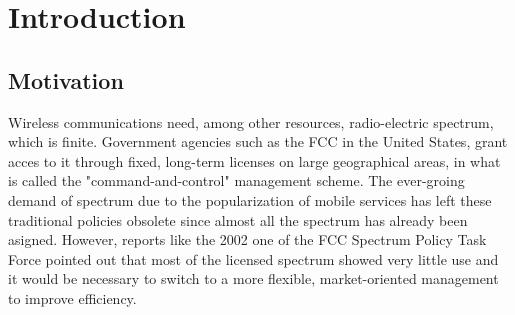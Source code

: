 \graphicspath{ {img/SPEC_MAN/} }
\chapter{Introduction}
\section{Motivation}

Wireless communications need, among other resources, radio-electric spectrum, which is finite. 
Government agencies such as the FCC in the United States, grant acces to it through fixed, long-term licenses on large geographical areas, in what is called the "command-and-control" management scheme. %
The ever-groing demand of spectrum due to the popularization of mobile services has left these traditional policies obsolete since almost all the spectrum has already been asigned. 
However, reports like the 2002 one of the FCC Spectrum Policy Task Force \cite{ref:FCC2002} pointed out that most of the licensed spectrum showed very little use and it would be necessary to switch to a more flexible, market-oriented management \cite{ref:Valletti2001} to improve efficiency. %